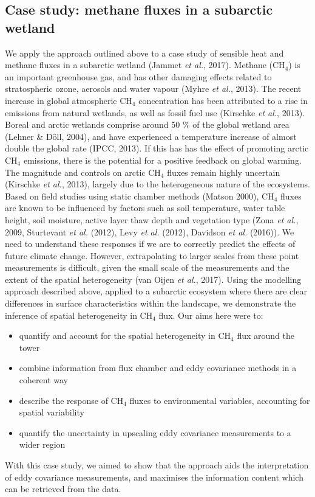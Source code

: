 \subsection{Case study: methane fluxes in a subarctic
wetland}\label{case-study-methane-fluxes-in-a-subarctic-wetland}

We apply the approach outlined above to a case study of sensible heat and methane fluxes
in a subarctic wetland (Jammet \emph{et al.}, 2017). Methane (CH\(_4\))
is an important greenhouse gas, and has other damaging effects related
to stratospheric ozone, aerosols and water vapour (Myhre \emph{et al.},
2013). The recent increase in global atmospheric CH\(_4\) concentration
has been attributed to a rise in emissions from natural wetlands, as
well as fossil fuel use (Kirschke \emph{et al.}, 2013). Boreal and
arctic wetlands comprise around 50 \% of the global wetland area (Lehner
\& Döll, 2004), and have experienced a temperature increase of almost
double the global rate (IPCC, 2013). If this has has the effect of
promoting arctic CH\(_4\) emissions, there is the potential for a
positive feedback on global warming. The magnitude and controls on
arctic CH\(_4\) fluxes remain highly uncertain (Kirschke \emph{et al.},
2013), largely due to the heterogeneous nature of the ecosystems. Based
on field studies using static chamber methods (Matson 2000), CH\(_4\)
fluxes are known to be influenced by factors such as soil temperature,
water table height, soil moisture, active layer thaw depth and
vegetation type (Zona \emph{et al.}, 2009, Sturtevant \emph{et al.}
(2012), Levy \emph{et al.} (2012), Davidson \emph{et al.} (2016)). We
need to understand these responses if we are to correctly predict the
effects of future climate change. However, extrapolating to larger
scales from these point measurements is difficult, given the small scale
of the measurements and the extent of the spatial heterogeneity (van
Oijen \emph{et al.}, 2017). Using the modelling approach described above,
applied to a subarctic ecosystem where there are clear differences in
surface characteristics within the landscape, we demonstrate the
inference of spatial heterogeneity in CH\(_4\) flux. Our aims here were
to:

\begin{itemize}
\item
  quantify and account for the spatial heterogeneity in CH\(_4\) flux
  around the tower
\item
  combine information from flux chamber and eddy covariance methods in a
  coherent way
\item
  describe the response of CH\(_4\) fluxes to environmental variables,
  accounting for spatial variability\\
\item
  quantify the uncertainty in upscaling eddy covariance measurements to
  a wider region
\end{itemize}

With this case study, we aimed to show that the approach aids the
interpretation of eddy covariance measurements, and maximises the
information content which can be retrieved from the data.